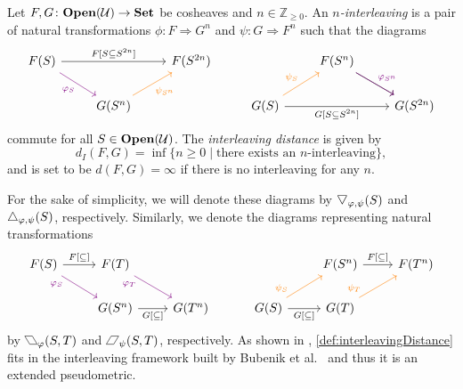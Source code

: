 \begin{definition}
\label{def:interleavingDistance}
Let $F,G\colon\mathbf{Open}(\mathcal{U}) \to \mathbf{Set}$ be cosheaves and $n \in \mathbb{Z}_{\geq 0}$. An \emph{$n$-interleaving} is a pair of natural transformations 
$\phi\colon F \Rightarrow G^n$
and 
$\psi\colon G \Rightarrow F^n$
such that the diagrams 
\begin{equation*}
    \begin{tikzcd}[ampersand replacement=\&]
        F(S) 
            \ar[rr, "{F[S \subseteq S^{2n}]}"]   
            \ar[dr, "\phi_S"',violet] 
            \& \& F(S^{2n}) \& 
        \& F(S^n) \ar[dr]
            \ar[dr, "\phi_{S^{n}}",violet]
        \& \\
        \& G(S^n)\ar[ur, "\psi_{S^n}"', orange]  \& \& 
        G(S) 
            \ar[rr, "{G[S \subseteq S^{2n}]}"']
            \ar[ur, "\psi_{S}", orange]  
        \&\& G(S^{2n})
    \end{tikzcd}
\end{equation*} 
commute for all $S \in \mathbf{Open}(\mathcal{U})$.
The \emph{interleaving distance} is given by 
\begin{equation*}
    d_I(F,G) = \inf\{ n \geq 0 \mid \text{there exists an $n$-interleaving} \}, 
\end{equation*}
and is set to be $d(F,G) = \infty$ if there is no interleaving for any $n$.
\end{definition}

For the sake of simplicity, we will denote these diagrams by $\triangled_{\phi,\psi}(S)$ and $\bigtriangleup_{\varphi,\psi}(S)$, respectively. Similarly, we denote the diagrams representing natural transformations
\begin{equation*}
    \begin{tikzcd}
        F(S)  
            \ar[r, "{F[\subseteq ]}"] 
            \ar[dr, "\phi_S"', very near start, violet]
        & F(T)
            \ar[dr, "\phi_T"', very near start, violet]
        & \\
        & G(S^n) 
            \ar[r, "{G[\subseteq ]}"'] 
        & G (T^n)
    \end{tikzcd}
    \hspace{1cm}
    \begin{tikzcd}
        & F(S^n)
            \ar[r, "{F[\subseteq ]}"] 
        & F (T^n)\\
        G(S)
            \ar[r, "{G[\subseteq ]}"'] 
            \ar[ur, "\psi_S", very near start, orange]
        & G(T) 
            \ar[ur, "\psi_T", very near start, orange]
        & 
    \end{tikzcd}
\end{equation*}
by $\Parallelograml_\phi(S,T)$ and $\Parallelogramr_\psi(S,T)$, respectively. 
As shown in \cite{chambers2023bounding}, \cref{def:interleavingDistance} fits in the interleaving framework built by Bubenik et al.~\cite{bubenik2015metrics} and thus it is an extended pseudometric.

